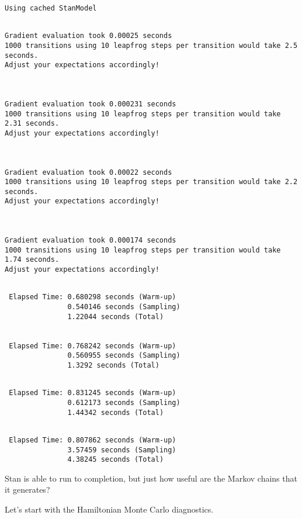 \documentclass[
  letterpaper,
  DIV=11,
  numbers=noendperiod]{scrartcl}
\begin{document}
\begin{verbatim}
Using cached StanModel
\end{verbatim}

\begin{verbatim}

Gradient evaluation took 0.00025 seconds
1000 transitions using 10 leapfrog steps per transition would take 2.5 seconds.
Adjust your expectations accordingly!



Gradient evaluation took 0.000231 seconds
1000 transitions using 10 leapfrog steps per transition would take 2.31 seconds.
Adjust your expectations accordingly!



Gradient evaluation took 0.00022 seconds
1000 transitions using 10 leapfrog steps per transition would take 2.2 seconds.
Adjust your expectations accordingly!



Gradient evaluation took 0.000174 seconds
1000 transitions using 10 leapfrog steps per transition would take 1.74 seconds.
Adjust your expectations accordingly!

\end{verbatim}

\begin{verbatim}

 Elapsed Time: 0.680298 seconds (Warm-up)
               0.540146 seconds (Sampling)
               1.22044 seconds (Total)


 Elapsed Time: 0.768242 seconds (Warm-up)
               0.560955 seconds (Sampling)
               1.3292 seconds (Total)
\end{verbatim}

\begin{verbatim}

 Elapsed Time: 0.831245 seconds (Warm-up)
               0.612173 seconds (Sampling)
               1.44342 seconds (Total)
\end{verbatim}

\begin{verbatim}

 Elapsed Time: 0.807862 seconds (Warm-up)
               3.57459 seconds (Sampling)
               4.38245 seconds (Total)
\end{verbatim}

Stan is able to run to completion, but just how useful are the Markov
chains that it generates?

Let's start with the Hamiltonian Monte Carlo diagnostics.
\end{document}
